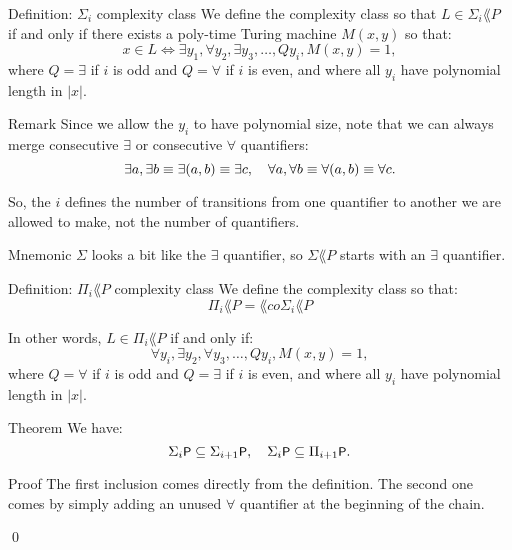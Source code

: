 \documentclass[a4paper]{article}
\begin{document}
\begin{parag}{Definition: $\Sigma_i$ complexity class}
    We define the  complexity class so that $L \in \Sigma_i \lang{P}$ if and only if there exists a poly-time Turing machine $M\left(x, y\right)$ so that:
    \[x \in L \iff \exists y_1, \forall y_2, \exists y_3, \ldots, Q y_i, M\left(x, y\right) = 1,\]
    where $Q = \exists$ if $i$ is odd and $Q = \forall$ if $i$ is even, and where all $y_i$ have polynomial length in $\left|x\right|$.

    \begin{subparag}{Remark}
        Since we allow the $y_i$ to have polynomial size, note that we can always merge consecutive $\exists$ or consecutive $\forall$ quantifiers: 
        \[\exists a, \exists b \equiv \exists \left(a, b\right) \equiv \exists c, \mathspace \forall a, \forall b \equiv \forall \left(a, b\right) \equiv \forall c.\]

        So, the $i$ defines the number of transitions from one quantifier to another we are allowed to make, not the number of quantifiers.
    \end{subparag}

    \begin{subparag}{Mnemonic}
        $\Sigma$ looks a bit like the $\exists$ quantifier, so $\Sigma \lang{P}$ starts with an $\exists$ quantifier.
    \end{subparag}
\end{parag}

\begin{parag}{Definition: $\Pi_i \lang{P}$ complexity class}
    We define the  complexity class so that:
    \[\Pi_i \lang{P} = \lang{co}\Sigma_i\lang{P}\]

    In other words, $L \in \Pi_{i} \lang{P}$ if and only if: 
    \[\forall y_i, \exists y_2, \forall y_3, \ldots, Q y_i, M\left(x, y\right) = 1,\]
    where $Q = \forall$ if $i$ is odd and $Q = \exists$ if $i$ is even, and where all $y_i$ have polynomial length in $\left|x\right|$.
\end{parag}

\begin{parag}{Theorem}
    We have: 
    \[\Sigma_i \lang{P} \subseteq \Sigma_{i+1} \lang{P}, \mathspace \Sigma_i \lang{P} \subseteq \Pi_{i+1} \lang{P}.\]

    \begin{subparag}{Proof}
        The first inclusion comes directly from the definition. The second one comes by simply adding an unused $\forall$ quantifier at the beginning of the chain.

        \qed
    \end{subparag}
\end{parag}
\end{document}
